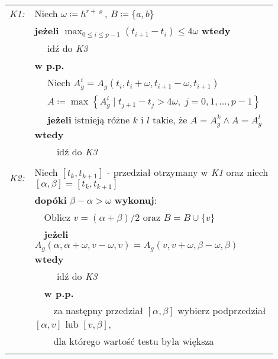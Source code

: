 \documentclass[oik, pdftex, robocza, man]{mgrwms}
\begin{document}
    \vspace{10pt}
    \noindent
    \begin{tabular}{p{0.045\linewidth} p{0.85\linewidth}}
        \textit{K1:}    & Niech $\omega \coloneqq h^{r+\varrho}$, $B \coloneqq \{a, b\}$ \\
                        & \textbf{jeżeli} \(\displaystyle \max_{0 \leq i \leq p-1} (t_{i+1} - t_{i}) \leq 4\omega \) \textbf{wtedy} \\
                        & $\quad$ idź do \textit{K3} \\
                        & \textbf{w p.p.} \\
                        & $\quad$ Niech $A_{g}^{i} = A_{g}\left(t_{i}, t_{i}+\omega, t_{i+1}-\omega, t_{i+1}\right)$ \\
                        & $\quad$ $A\coloneqq\max \left\{A_{g}^{i} \mid t_{j+1}-t_{j}>4 \omega,\; j=0,1, \ldots, p-1 \right\}$ \\
                        & $\quad$ \textbf{jeżeli} istnieją różne $k$ i $l$ takie, że $A = A_{g}^{k} \land A = A_{g}^{l}$ \textbf{wtedy} \\
                        & $\quad\quad$ idź do \textit{K3} \\
                        & \\

        \textit{K2:}    & Niech $[t_{k}, t_{k+1}]$ - przedział otrzymany w \textit{K1} oraz niech $[\alpha,\beta] = [t_{k}, t_{k+1}]$ \\
                        & \textbf{dopóki} $\beta - \alpha > \omega$ \textbf{wykonuj}: \\
                        & $\quad$Oblicz $v = (\alpha + \beta) / 2$ oraz $B = B \cup \{v\}$ \\
                        & $\quad$\textbf{jeżeli} $A_{g}(\alpha, \alpha + \omega, v - \omega, v) = A_{g}(v, v + \omega, \beta - \omega, \beta)$ \textbf{wtedy} \\
                        & $\quad$$\quad$ idź do \textit{K3} \\
                        & $\quad$\textbf{w p.p.} \\
                        & $\quad$$\quad$za następny przedział $[\alpha, \beta]$ wybierz podprzedział $[\alpha, v]$ lub $[v, \beta]$, \\
                        & $\quad$$\quad$dla którego wartość testu była większa \\
                        &  \\


\end{tabular}
\end{document}
